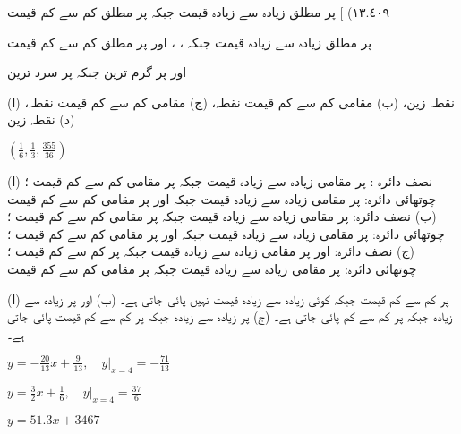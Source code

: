 \begin {description}
\protect ١٣.\protect ٤٠٩)
]
  پر مطلق زیادہ سے زیادہ قیمت  جبکہ  پر مطلق کم سے کم قیمت  
\item [
\protect ١٣.\protect ٤١١)
]
  پر مطلق زیادہ سے زیادہ قیمت  جبکہ ، ،  اور  پر مطلق کم سے کم قیمت  
\item [
\protect ١٣.\protect ٤١٣)
]
\item [
\protect ١٣.\protect ٤١٥)
]
  اور  پر گرم ترین  جبکہ  پر سرد ترین  
\item [
\protect ١٣.\protect ٤١٧)
]
 (ا)  نقطہ زین، (ب)  مقامی کم سے کم قیمت نقطہ، (ج)  مقامی کم سے کم قیمت نقطہ، (د)  نقطہ زین 
\item [
\protect ١٣.\protect ٤٢٣)
]
 $(\tfrac {1}{6},\tfrac {1}{3},\tfrac {355}{36})$ 
\item [
\protect ١٣.\protect ٤٢٧)
]
 (ا) نصف دائرہ :  پر مقامی زیادہ سے زیادہ قیمت  جبکہ  پر مقامی کم سے کم قیمت ؛ چوتھائی دائرہ:  پر مقامی زیادہ سے زیادہ قیمت  جبکہ  اور  پر مقامی کم سے کم قیمت  (ب) نصف دائرہ:  پر مقامی زیادہ سے زیادہ قیمت  جبکہ  پر مقامی کم سے کم قیمت ؛ چوتھائی دائرہ:  پر مقامی زیادہ سے زیادہ قیمت  جبکہ  اور  پر مقامی کم سے کم قیمت ؛ (ج) نصف دائرہ:  اور  پر مقامی زیادہ سے زیادہ قیمت  جبکہ  پر کم سے کم قیمت ؛ چوتھائی دائرہ:  پر مقامی زیادہ سے زیادہ قیمت  جبکہ  پر مقامی کم سے کم قیمت  
\item [
\protect ١٣.\protect ٤٢٩)
]
 (ا)  پر کم سے کم قیمت  جبکہ کوئی زیادہ سے زیادہ قیمت نہیں پائی جاتی ہے۔ (ب)  اور  پر زیادہ سے زیادہ  جبکہ  پر کم سے کم  پائی جاتی ہے۔ (ج)  پر زیادہ سے زیادہ  جبکہ  پر کم سے کم قیمت  پائی جاتی ہے۔ 
\item [
\protect ١٣.\protect ٤٣١)
]
 $y=-\frac {20}{13}x+\frac {9}{13},\quad \left .y\right \vert _{x=4}=-\frac {71}{13}$ 
\item [
\protect ١٣.\protect ٤٣٣)
]
 $y=\frac {3}{2}x+\frac {1}{6},\quad \left .y\right \vert _{x=4}=\frac {37}{6}$ 
\item [
\protect ١٣.\protect ٤٣٥)
]
 $y=51.3x+3467$ 
\end {description}
